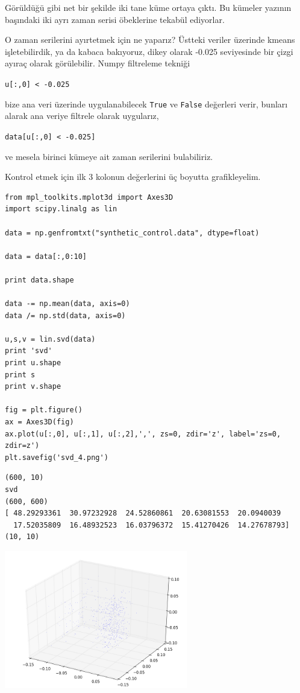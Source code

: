 \documentclass[12pt,fleqn]{article}\usepackage{../../common}
\begin{document}
Görüldüğü gibi net bir şekilde iki tane küme ortaya çıktı. Bu kümeler yazının
başındaki iki ayrı zaman serisi öbeklerine tekabül ediyorlar.

O zaman serilerini ayırtetmek için ne yaparız? Üstteki veriler üzerinde kmeans
işletebilirdik, ya da kabaca bakıyoruz, dikey olarak -0.025 seviyesinde bir
çizgi ayıraç olarak görülebilir. Numpy filtreleme tekniği

\verb!u[:,0] < -0.025!

bize ana veri üzerinde uygulanabilecek \verb!True! ve \verb!False!  değerleri
verir, bunları alarak ana veriye filtrele olarak uygularız,

\verb!data[u[:,0] < -0.025]!

ve mesela birinci kümeye ait zaman serilerini bulabiliriz. 

Kontrol etmek için ilk 3 kolonun değerlerini üç boyutta grafikleyelim.

\begin{verbatim}
from mpl_toolkits.mplot3d import Axes3D
import scipy.linalg as lin

data = np.genfromtxt("synthetic_control.data", dtype=float)

data = data[:,0:10]

print data.shape

data -= np.mean(data, axis=0)
data /= np.std(data, axis=0)

u,s,v = lin.svd(data)
print 'svd'
print u.shape
print s
print v.shape

fig = plt.figure()
ax = Axes3D(fig)
ax.plot(u[:,0], u[:,1], u[:,2],',', zs=0, zdir='z', label='zs=0, zdir=z')
plt.savefig('svd_4.png')
\end{verbatim}

\begin{verbatim}
(600, 10)
svd
(600, 600)
[ 48.29293361  30.97232928  24.52860861  20.63081553  20.0940039
  17.52035809  16.48932523  16.03796372  15.41270426  14.27678793]
(10, 10)
\end{verbatim}

\includegraphics[height=6cm]{svd_4.png}
\end{document}
